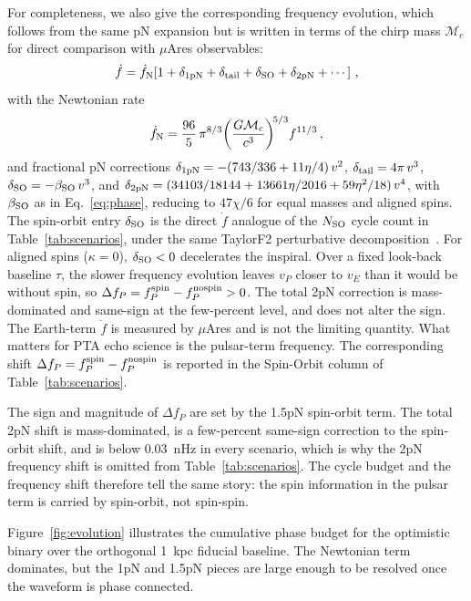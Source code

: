 \documentclass[aps,prx,twocolumn,superscriptaddress,nofootinbib,longbibliography]{revtex4-2}
\begin{document}
For completeness, we also give the corresponding frequency evolution, which follows from the same pN expansion but is written in terms of the chirp mass $\mathcal{M}_c$ for direct comparison with $\mu$Ares observables:
\begin{equation}\label{eq:fdot}
  \dot{f} = \dot{f}_{\rm N}
  \!\left[1 + \delta_{\rm 1pN} + \delta_{\rm tail} + \delta_{\rm SO} + \delta_{\rm 2pN} + \cdots\right] \, ,
\end{equation}
with the Newtonian rate
\begin{equation}\label{eq:fdotN}
 \dot{f}_{\rm N} = \frac{96}{5}\,\pi^{8/3}\!\left(\frac{G\mathcal{M}_c}{c^3}\right)^{\!5/3}\!f^{11/3}\, ,
 \end{equation}
 and fractional pN corrections $\delta_{\rm 1pN}=-(743/336+11\eta/4)\,v^2$, $\delta_{\rm tail}=4\pi\,v^3$, $\delta_{\rm SO}=-\beta_{\rm SO}\,v^3$, and $\delta_{\rm 2pN}=(34103/18144+13661\eta/2016+59\eta^2/18)\,v^4$, with $\beta_{\rm SO}$ as in Eq.~\eqref{eq:phase}, reducing to $47\chi/6$ for equal masses and aligned spins. The spin-orbit entry $\delta_{\rm SO}$ is the direct $\dot f$ analogue of the $N_{\rm SO}$ cycle count in Table~\ref{tab:scenarios}, under the same TaylorF2 perturbative decomposition~\cite{Mingarelli2012}. For aligned spins ($\kappa=0$), $\delta_{\rm SO}<0$ decelerates the inspiral. Over a fixed look-back baseline $\tau$, the slower frequency evolution leaves $v_P$ closer to $v_E$ than it would be without spin, so $\Delta f_P = f_P^{\rm spin}-f_P^{\rm nospin}>0$. The total 2pN correction is mass-dominated and same-sign at the few-percent level, and does not alter the sign. The Earth-term $\dot f$ is measured by $\mu$Ares and is not the limiting quantity. What matters for PTA echo science is the pulsar-term frequency. The corresponding shift $\Delta f_P = f_P^{\rm spin} - f_P^{\rm nospin}$ is reported in the Spin-Orbit column of Table~\ref{tab:scenarios}.

The sign and magnitude of $\Delta f_P$ are set by the 1.5pN spin-orbit term. The total 2pN shift is mass-dominated, is a few-percent same-sign correction to the spin-orbit shift, and is below $0.03$~nHz in every scenario, which is why the 2pN frequency shift is omitted from Table~\ref{tab:scenarios}. The cycle budget and the frequency shift therefore tell the same story: the spin information in the pulsar term is carried by spin-orbit, not spin-spin.

Figure~\ref{fig:evolution} illustrates the cumulative phase budget for the optimistic binary over the orthogonal 1~kpc fiducial baseline. The Newtonian term dominates, but the 1pN and 1.5pN pieces are large enough to be resolved once the waveform is phase connected.
\end{document}
